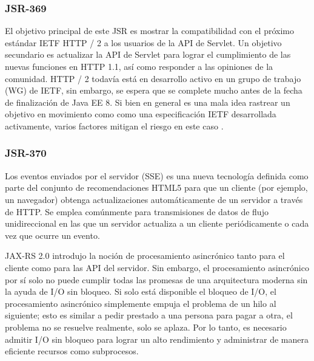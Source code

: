 \begin{spacing}{1.5}
		\subsubsection{JSR-369}
				El objetivo principal de este JSR es mostrar la compatibilidad con el próximo estándar IETF HTTP / 2 a los usuarios de la API de Servlet. Un objetivo secundario es actualizar la API de Servlet para lograr el cumplimiento de las nuevas funciones en HTTP 1.1, así como responder a las opiniones de la comunidad.
				HTTP / 2 todavía está en desarrollo activo en un grupo de trabajo (WG) de IETF, sin embargo, se espera que se complete mucho antes de la fecha de finalización de Java EE 8. Si bien en general es una mala idea rastrear un objetivo en movimiento como como una especificación IETF desarrollada activamente, varios factores mitigan el riesgo en este caso \cite{chap2_jsr_369}.
		\subsubsection{JSR-370}
			Los eventos enviados por el servidor (SSE) es una nueva tecnología definida como parte del conjunto de recomendaciones HTML5 para que un cliente (por ejemplo, un navegador) obtenga actualizaciones automáticamente de un servidor a través de HTTP. Se emplea comúnmente para transmisiones de datos de flujo unidireccional en las que un servidor actualiza a un cliente periódicamente o cada vez que ocurre un evento.
			
			JAX-RS 2.0 introdujo la noción de procesamiento asincrónico tanto para el cliente como para las API del servidor. Sin embargo, el procesamiento asincrónico por sí solo no puede cumplir todas las promesas de una arquitectura moderna sin la ayuda de I/O sin bloqueo. Si solo está disponible el bloqueo de I/O, el procesamiento asincrónico simplemente empuja el problema de un hilo al siguiente; esto es similar a pedir prestado a una persona para pagar a otra, el problema no se resuelve realmente, solo se aplaza. Por lo tanto, es necesario admitir I/O sin bloqueo para lograr un alto rendimiento y administrar de manera eficiente recursos como subprocesos.\\
			\cite{chap2_jsr_370}

\end{spacing}
